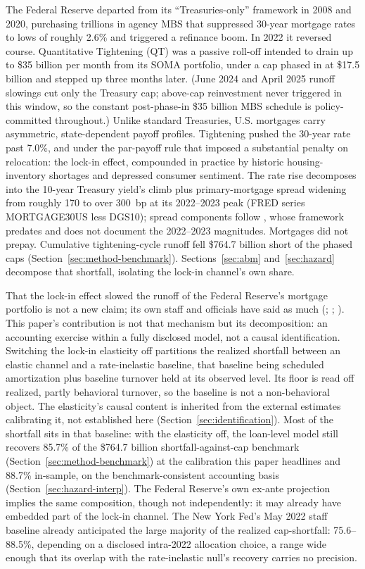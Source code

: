 \documentclass[12pt]{article}
\begin{document}
The Federal Reserve departed from its ``Treasuries-only'' framework in 2008 and 2020, purchasing trillions in agency MBS that suppressed 30-year mortgage rates to lows of roughly 2.6\% \citep{hancock2011} and triggered a refinance boom. In 2022 it reversed course. Quantitative Tightening (QT) was a passive roll-off intended to drain up to \$35 billion per month from its SOMA portfolio, under a cap phased in at \$17.5 billion and stepped up three months later. (June 2024 and April 2025 runoff slowings cut only the Treasury cap; above-cap reinvestment never triggered in this window, so the constant post-phase-in \$35 billion MBS schedule is policy-committed throughout.) Unlike standard Treasuries, U.S. mortgages carry asymmetric, state-dependent payoff profiles. Tightening pushed the 30-year rate past 7.0\%, and under the par-payoff rule that imposed a substantial penalty on relocation: the lock-in effect, compounded in practice by historic housing-inventory shortages and depressed consumer sentiment. The rate rise decomposes into the 10-year Treasury yield's climb plus primary-mortgage spread widening from roughly 170 to over 300~bp at its 2022--2023 peak (FRED series MORTGAGE30US less DGS10); spread components follow \citet{boyarchenko2019}, whose framework predates and does not document the 2022--2023 magnitudes. Mortgages did not prepay. Cumulative tightening-cycle runoff fell \$764.7 billion short of the phased caps \citep[on the balance-sheet setting, see][]{lopezsalido2023,acharya2023} (Section~\ref{sec:method-benchmark}). Sections~\ref{sec:abm} and~\ref{sec:hazard} decompose that shortfall, isolating the lock-in channel's own share.

That the lock-in effect slowed the runoff of the Federal Reserve's mortgage portfolio is not a new claim; its own staff and officials have said as much (\citealp{na2024}; \citealp{perli2024}; \citealp{hammack2025}). This paper's contribution is not that mechanism but its decomposition: an accounting exercise within a fully disclosed model, not a causal identification. Switching the lock-in elasticity off partitions the realized shortfall between an elastic channel and a rate-inelastic baseline, that baseline being scheduled amortization plus baseline turnover held at its observed level. Its floor is read off realized, partly behavioral turnover, so the baseline is not a non-behavioral object. The elasticity's causal content is inherited from the external estimates calibrating it, not established here (Section~\ref{sec:identification}). Most of the shortfall sits in that baseline: with the elasticity off, the loan-level model still recovers 85.7\% of the \$764.7 billion shortfall-against-cap benchmark (Section~\ref{sec:method-benchmark}) at the calibration this paper headlines and 88.7\% in-sample, on the benchmark-consistent accounting basis (Section~\ref{sec:hazard-interp}). The Federal Reserve's own ex-ante projection implies the same composition, though not independently: it may already have embedded part of the lock-in channel. The New York Fed's May 2022 staff baseline already anticipated the large majority of the realized cap-shortfall: 75.6--88.5\%, depending on a disclosed intra-2022 allocation choice, a range wide enough that its overlap with the rate-inelastic null's recovery carries no precision.
\end{document}
